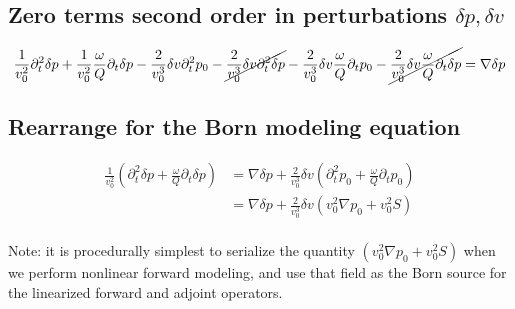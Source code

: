 \documentclass[10pt,fleqn]{article}
\begin{document}
\subsection{Zero terms second order in perturbations $\delta p,\delta v$ }
\begin{equation}
\frac{1}{v_0^2} \partial_t^2 \delta p
+ \frac{1}{v_0^2} \frac{\omega}{Q} \partial_t \delta p
- \frac{2}{v_0^3} \delta v \partial_t^2 p_0
- \cancel{ \frac{2}{v_0^3} \delta v \partial_t^2 \delta p }
- \frac{2}{v_0^3} \delta v \frac{\omega}{Q} \partial_t p_0
- \cancel{ \frac{2}{v_0^3} \delta v \frac{\omega}{Q} \partial_t \delta p }
= \nabla \delta p 
\end{equation}

\subsection{Rearrange for the Born modeling equation}
\begin{equation}
\begin{aligned}
\frac{1}{v_0^2} \left( \partial_t^2 \delta p + \frac{\omega}{Q} \partial_t \delta p \right) 
&= \nabla \delta p + \frac{2}{v_0^3} \delta v \left( \partial_t^2 p_0 + \frac{\omega}{Q} \partial_t p_0 \right) \\[10pt]
&= \nabla \delta p + \frac{2}{v_0^3} \delta v \left( v_0^2 \nabla p_0 + v_0^2 S \right) \\[10pt]
\end{aligned}
\end{equation}

Note: it is procedurally simplest to serialize the quantity
$\displaystyle \left( v_0^2 \nabla p_0 + v_0^2 S \right)$ when we perform nonlinear
forward modeling, and use that field as the Born source for the linearized forward
and adjoint operators.  
\end{document}
